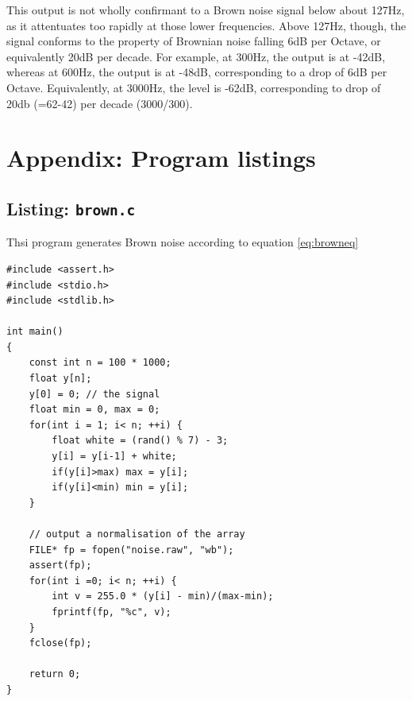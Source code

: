 \documentclass[a4paper,10pt]{article}
\def\code#1{\texttt{#1}}
\begin{document}
This output is not wholly confirmant to a Brown noise signal below about 127Hz, as it attentuates too rapidly at those lower frequencies. Above 127Hz, though, the signal conforms to the property of Brownian noise falling 6dB per Octave, or equivalently 20dB per decade\cite{brown}. For example, at 300Hz, the output is at -42dB, whereas at 600Hz, the output is at -48dB, corresponding to a drop of 6dB per Octave. Equivalently, at 3000Hz, the level is -62dB, corresponding to drop of 20db (=62-42) per decade (3000/300).


\appendix

\section{Appendix: Program listings}

\label{sec:brown}
\subsection{Listing: \code{brown.c}} 

Thsi program generates Brown noise according to equation \ref{eq:browneq}

\begin{Verbatim}[tabsize=8]
#include <assert.h>
#include <stdio.h>
#include <stdlib.h>

int main()
{
	const int n = 100 * 1000;
	float y[n];
	y[0] = 0; // the signal
	float min = 0, max = 0;
	for(int i = 1; i< n; ++i) {
		float white = (rand() % 7) - 3;
		y[i] = y[i-1] + white;
		if(y[i]>max) max = y[i];
		if(y[i]<min) min = y[i];
	}

	// output a normalisation of the array
	FILE* fp = fopen("noise.raw", "wb");
	assert(fp);
	for(int i =0; i< n; ++i) {
		int v = 255.0 * (y[i] - min)/(max-min);
		fprintf(fp, "%c", v);
	}
	fclose(fp);

	return 0;
}
\end{Verbatim}
\end{document}
